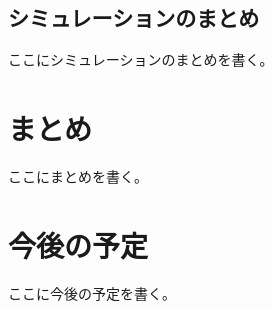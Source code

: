 \documentclass[10pt,onecolumn,fleqn]{jsarticle}
\begin{document}
\subsection{シミュレーションのまとめ}
ここにシミュレーションのまとめを書く。


\section{まとめ}
ここにまとめを書く。

\section{今後の予定}
ここに今後の予定を書く。

\small
%
%

\normalsize
\end{document}

